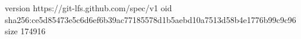 version https://git-lfs.github.com/spec/v1
oid sha256:ce5d85473e5c6d6ef6b39ac77185578d1b5aebd10a7513d58b4e1776b99c9c96
size 174916
